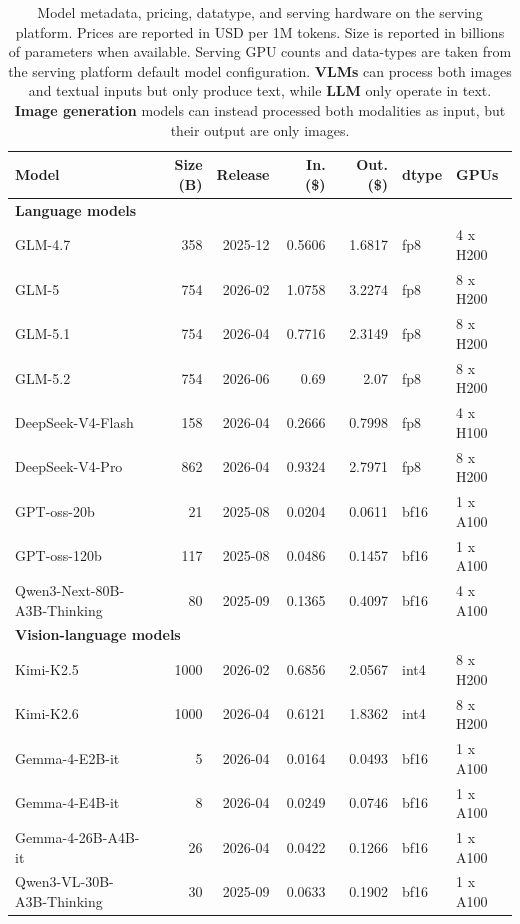 
\begin{table}[]
\caption{Model metadata, pricing, datatype, and serving hardware on the serving platform. Prices are reported in USD per 1M tokens. Size is reported in billions of parameters when available. Serving GPU counts and data-types are taken from the serving platform default model configuration.
\textbf{VLMs} can process both images and textual inputs but only produce text, while \textbf{LLM} only operate in text. \textbf{Image generation} models can instead processed both modalities as input, but their output are only images.}
\small
\label{tab:models-serving-hardware}
\begin{tabular}{lrrrrll}
\toprule
\textbf{Model} &
\textbf{Size (B)} &
\textbf{Release} &
\textbf{In. (\$)} &
\textbf{Out. (\$)} &
\textbf{dtype} &
\textbf{GPUs} \\
\midrule
\multicolumn{7}{l}{\textbf{Language models}} \\
\midrule
GLM-4.7 & 358 & 2025-12 & 0.5606 & 1.6817 & fp8 & 4 x H200 \\
GLM-5 & 754 & 2026-02 & 1.0758 & 3.2274 & fp8 & 8 x H200 \\
GLM-5.1 & 754 & 2026-04 & 0.7716 & 2.3149 & fp8 & 8 x H200 \\
GLM-5.2 & 754 & 2026-06 & 0.69 & 2.07 & fp8 & 8 x H200 \\
DeepSeek-V4-Flash & 158 & 2026-04 & 0.2666 & 0.7998 & fp8 & 4 x H100 \\
DeepSeek-V4-Pro & 862 & 2026-04 & 0.9324 & 2.7971 & fp8 & 8 x H200 \\
GPT-oss-20b & 21 & 2025-08 & 0.0204 & 0.0611 & bf16 & 1 x A100 \\
GPT-oss-120b & 117 & 2025-08 & 0.0486 & 0.1457 & bf16 & 1 x A100 \\
Qwen3-Next-80B-A3B-Thinking & 80 & 2025-09 & 0.1365 & 0.4097 & bf16 & 4 x A100 \\
\midrule
\multicolumn{7}{l}{\textbf{Vision-language models}} \\
\midrule
Kimi-K2.5 & 1000 & 2026-02 & 0.6856 & 2.0567 & int4 & 8 x H200 \\
Kimi-K2.6 & 1000 & 2026-04 & 0.6121 & 1.8362 & int4 & 8 x H200 \\
Gemma-4-E2B-it & 5 & 2026-04 & 0.0164 & 0.0493 & bf16 & 1 x A100 \\
Gemma-4-E4B-it & 8 & 2026-04 & 0.0249 & 0.0746 & bf16 & 1 x A100 \\
Gemma-4-26B-A4B-it & 26 & 2026-04 & 0.0422 & 0.1266 & bf16 & 1 x A100 \\
Qwen3-VL-30B-A3B-Thinking & 30 & 2025-09 & 0.0633 & 0.1902 & bf16 & 1 x A100 \\

\end{tabular}
\end{table}
